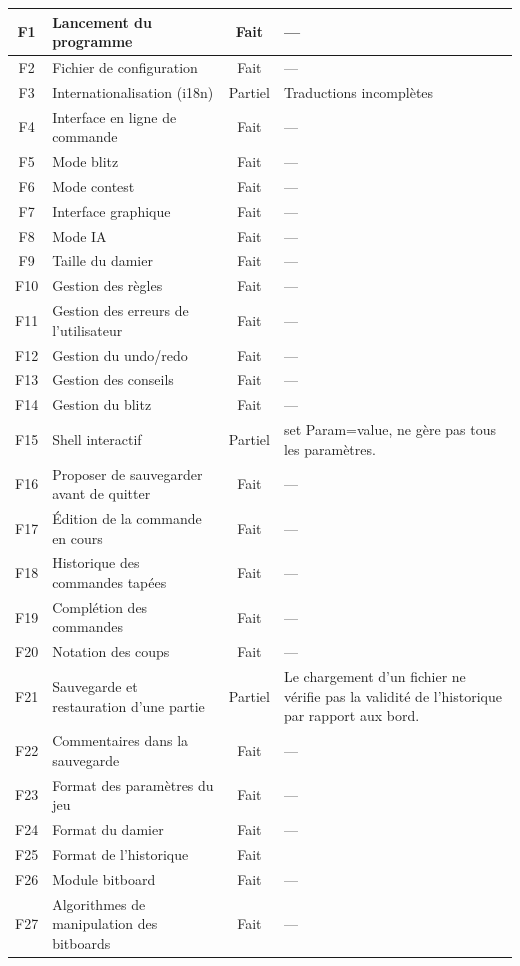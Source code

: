 \documentclass[a4paper]{article}
\begin{document}
\begin{longtable}{|c|p{7.3cm}|c|p{5.2cm}|}
F1 & Lancement du programme & Fait & --- \\ \hline
F2 & Fichier de configuration & Fait & --- \\ \hline
F3 & Internationalisation (i18n) & Partiel & Traductions incomplètes \\ \hline
F4 & Interface en ligne de commande & Fait & --- \\ \hline
F5 & Mode blitz & Fait & --- \\ \hline
F6 & Mode contest & Fait & --- \\ \hline
F7 & Interface graphique & Fait & --- \\ \hline
F8 & Mode IA & Fait & --- \\ \hline
F9 & Taille du damier & Fait & --- \\ \hline
F10 & Gestion des règles & Fait & --- \\ \hline
F11 & Gestion des erreurs de l’utilisateur & Fait & --- \\ \hline
F12 & Gestion du undo/redo & Fait & --- \\ \hline
F13 & Gestion des conseils & Fait & --- \\ \hline
F14 & Gestion du blitz & Fait & --- \\ \hline
F15 & Shell interactif & Partiel & set Param=value, ne gère pas tous les paramètres. \\ \hline
F16 & Proposer de sauvegarder avant de quitter & Fait & --- \\ \hline
F17 & Édition de la commande en cours & Fait & --- \\ \hline
F18 & Historique des commandes tapées & Fait & --- \\ \hline
F19 & Complétion des commandes & Fait & --- \\ \hline
F20 & Notation des coups & Fait & --- \\ \hline
F21 & Sauvegarde et restauration d’une partie & Partiel & Le chargement d'un fichier ne vérifie pas la validité de l'historique par rapport aux bord. \\ \hline
F22 & Commentaires dans la sauvegarde & Fait & --- \\ \hline
F23 & Format des paramètres du jeu & Fait & --- \\ \hline
F24 & Format du damier & Fait & --- \\ \hline
F25 & Format de l’historique & Fait &  \\ \hline
F26 & Module bitboard & Fait & --- \\ \hline
F27 & Algorithmes de manipulation des bitboards & Fait & --- \\ \hline

\end{longtable}
\end{document}
